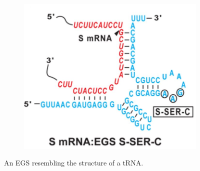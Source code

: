 \documentclass[twoside,a4paper]{report}
\begin{document}
\begin{figure}[h!tb]
\begin{subfigure}{.25\textwidth}
	 		\label{fig:sc386c}
	 	\end{subfigure}%
	 	\begin{subfigure}{.25\textwidth}
	 		\centering
	 		\includegraphics[width=.9\linewidth]{SERC}
	 		
	 		\label{fig:SERC}
	 	\end{subfigure}
 	\caption{An EGS resembling the structure of a tRNA.}
	 	\label{fig:test1}
	 \end{figure}
	 
\end{document}
